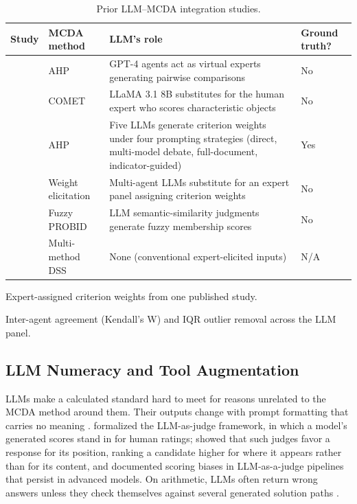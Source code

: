 \documentclass[final,3p,times]{elsarticle}
\begin{document}
\begin{table}[htbp]
\caption{Prior LLM--MCDA integration studies.}
\label{tab:llm-mcda-prior-work}
\centering
\begin{threeparttable}
\centering
\footnotesize
\begin{tabular}{@{}>{\raggedright\arraybackslash}p{}>{\raggedright\arraybackslash}p{}>{\raggedright\arraybackslash}p{}p{}@{}}
\toprule
\textbf{Study} & \textbf{MCDA method} & \textbf{LLM's role} & \textbf{Ground truth?} \\
\midrule
\citet{svoboda2024} & AHP & GPT-4 agents act as virtual experts generating pairwise comparisons & No \\
\citet{icaart26} & COMET & LLaMA 3.1 8B substitutes for the human expert who scores characteristic objects & No \\
\citet{cheng2026wildfire} & AHP & Five LLMs generate criterion weights under four prompting strategies (direct, multi-model debate, full-document, indicator-guided) & Yes\tnote{a} \\
\citet{vahidnia2025walmas} & Weight elicitation & Multi-agent LLMs substitute for an expert panel assigning criterion weights & No\tnote{b} \\
\citet{anhao2025probid} & Fuzzy PROBID & LLM semantic-similarity judgments generate fuzzy membership scores & No \\
\citet{huangburgherr2024} & Multi-method DSS & None (conventional expert-elicited inputs) & N/A \\
\bottomrule
\end{tabular}
\begin{tablenotes}
\item[a] Expert-assigned criterion weights from one published study.
\item[b] Inter-agent agreement (Kendall's W) and IQR outlier removal across the LLM panel.
\end{tablenotes}
\end{threeparttable}
\end{table}

\subsection{LLM Numeracy and Tool Augmentation}
\label{sec:lit-numeracy}

LLMs make a calculated standard hard to meet for reasons unrelated to the MCDA method around them. Their outputs change with prompt formatting that carries no meaning \cite{sclar2024promptsensitivity}. \citet{zheng2023judging} formalized the LLM-as-judge framework, in which a model's generated scores stand in for human ratings; \citet{wang2024fairescalers} showed that such judges favor a response for its position, ranking a candidate higher for where it appears rather than for its content, and \citet{li2026scoringbias} documented scoring biases in LLM-as-a-judge pipelines that persist in advanced models. On arithmetic, LLMs often return wrong answers unless they check themselves against several generated solution paths \cite{imani2023mathprompter}.
\end{document}
